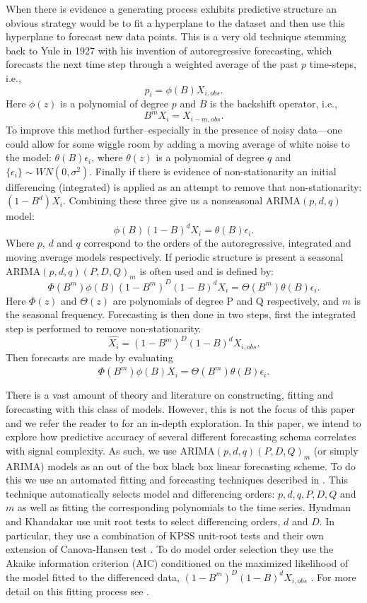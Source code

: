 When there is evidence a generating process exhibits predictive structure an obvious strategy would be to fit a hyperplane to the dataset and then use this hyperplane to forecast new data points. This is a very old technique stemming back to Yule in 1927\cite{weigend93} with his invention of autoregressive forecasting, which forecasts the next time step through a weighted average of the past $p$ time-steps, i.e., $$p_i = \phi(B)X_{i,obs}.$$ Here $\phi(z)$ is a polynomial of degree $p$ and $B$ is the backshift operator, i.e., $$B^mX_i  = X_{i-m,obs}.$$
To improve this method further--especially in the presence of noisy data---one could allow for some wiggle room by adding a moving average of white noise to the model: $\theta(B)\epsilon_i$, where $\theta(z)$ is a polynomial of degree $q$ and $\{\epsilon_i\}\sim WN(0,\sigma^2)$. Finally if there is evidence of non-stationarity an initial differencing (integrated) is applied as an attempt to remove that non-stationarity: $(1-B^d)X_i$. Combining these three give us a nonseasonal  ARIMA$(p,d,q)$ model:  $$\phi(B)(1-B)^dX_i = \theta(B)\epsilon_i.$$ Where $p$, $d$ and $q$ correspond to the orders of the autoregressive, integrated and moving average models respectively. If periodic structure is present a seasonal ARIMA$(p,d,q)(P,D,Q)_m$ is often used and is defined by:$$\Phi(B^m)\phi(B)(1-B^m)^D(1-B)^dX_i = \Theta(B^m)\theta(B)\epsilon_i.$$ Here $\Phi(z)$ and $\Theta(z)$ are polynomials of degree P and Q respectively, and $m$ is the seasonal frequency. Forecasting is then done in two steps, first the integrated step is performed to remove non-stationarity. $$\hat{X_i} = (1-B^m)^D(1-B)^d X_{i,obs}.$$ Then forecasts are made by evaluating $$\Phi(B^m)\phi(B)\hat{X_i} = \Theta(B^m)\theta(B)\epsilon_i.$$

There is a vast amount of theory and literature on constructing, fitting and forecasting with this class of models. However, this is not the focus of this paper and  we refer the reader to \cite{davislinearts} for an in-depth exploration. In this paper, we intend to explore how predictive accuracy of several different forecasting schema correlates with signal complexity. As such, we use ARIMA$(p,d,q)(P,D,Q)_m$ (or simply ARIMA) models as an out of the box black box linear forecasting scheme. To do this we use an automated fitting and forecasting techniques described in \cite{autoARIMA}. This technique automatically selects model and differencing orders: $p, d, q, P, D, Q$ and $m$ as well as fitting the corresponding polynomials to the time series. Hyndman and Khandakar use unit root tests to select differencing orders, $d$ and $D$. In particular, they use a combination of  
KPSS unit-root tests \cite{KPSSunit} and their own extension of Canova-Hansen test \cite{Canova1995}. To do model order selection they use the Akaike information criterion (AIC) \cite{akaike1974} conditioned on the maximized likelihood of the  model fitted to the differenced data, $(1-B^m)^D(1-B)^d X_{i,obs}$ \cite{autoARIMA}. For more detail on this fitting process see \cite{autoARIMA}.

